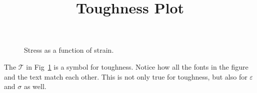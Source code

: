 \documentclass[11pt, oneside]{article}   	%
\title{Toughness Plot}
\date{}
\begin{document}
\maketitle

\begin{figure}[htbp] %
   \centering
   \scalebox{0.75}{}
   \caption{Stress as a function of strain.}
   \label{fig:ss}
\end{figure}
%
The $\mathcal{T}$ in Fig~\ref{fig:ss} is a symbol for toughness.  Notice how all the fonts in the figure and the text match each other.  This is not only true for toughness, but also for $\varepsilon$ and $\sigma$ as well.
\end{document}
